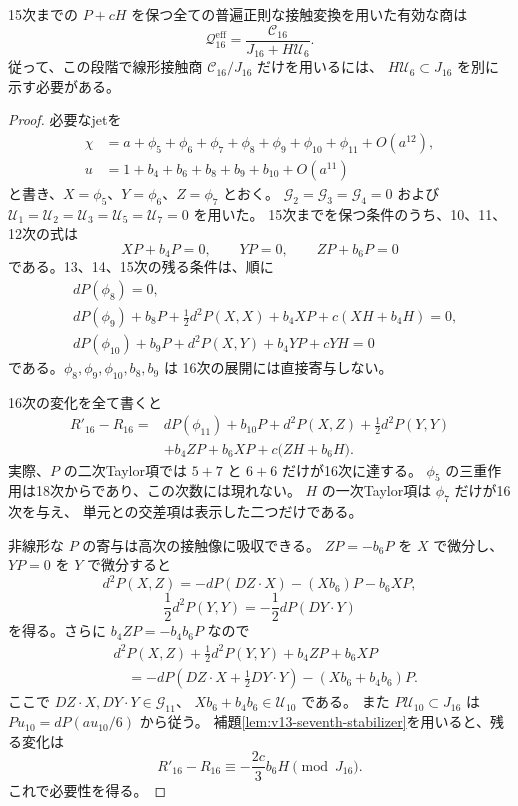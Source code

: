 \begin{proposition}[16次の有効な接触商]
\label{prop:v13-effective-contact-sixteen}
15次までの $P+cH$ を保つ全ての普遍正則な接触変換を用いた有効な商は
\begin{equation}\label{eq:v13-effective-sixteen-quotient}
 \boxed{\displaystyle
 \mathcal Q^{\mathrm{eff}}_{16}
 =\frac{\mathcal C_{16}}{J_{16}+H\mathcal U_6}.
 }
\end{equation}
従って、この段階で線形接触商 $\mathcal C_{16}/J_{16}$ だけを用いるには、
$H\mathcal U_6\subset J_{16}$ を別に示す必要がある。
\end{proposition}
\begin{proof}
必要なjetを
\begin{align*}
 \chi&=a+\phi_5+\phi_6+\phi_7+\phi_8+\phi_9
                +\phi_{10}+\phi_{11}+O(a^{12}),\\
 u&=1+b_4+b_6+b_8+b_9+b_{10}+O(a^{11})
\end{align*}
と書き、$X=\phi_5$、$Y=\phi_6$、$Z=\phi_7$ とおく。
$\mathcal G_2=\mathcal G_3=\mathcal G_4=0$ および
$\mathcal U_1=\mathcal U_2=\mathcal U_3=\mathcal U_5=\mathcal U_7=0$
を用いた。
15次までを保つ条件のうち、10、11、12次の式は
\[
 XP+b_4P=0,\qquad YP=0,\qquad ZP+b_6P=0
\]
である。13、14、15次の残る条件は、順に
\begin{align*}
 &dP(\phi_8)=0,\\
 &dP(\phi_9)+b_8P+\frac12d^2P(X,X)+b_4XP
                         +c(XH+b_4H)=0,\\
 &dP(\phi_{10})+b_9P+d^2P(X,Y)+b_4YP+cYH=0
\end{align*}
である。$\phi_8,\phi_9,\phi_{10},b_8,b_9$ は
16次の展開には直接寄与しない。

16次の変化を全て書くと
\begin{align*}
 R'_{16}-R_{16}
 ={}&dP(\phi_{11})+b_{10}P
       +d^2P(X,Z)+\frac12d^2P(Y,Y)\\
    &+b_4ZP+b_6XP+c\bigl(ZH+b_6H\bigr).
\end{align*}
実際、$P$ の二次Taylor項では $5+7$ と $6+6$ だけが16次に達する。
$\phi_5$ の三重作用は18次からであり、この次数には現れない。
$H$ の一次Taylor項は $\phi_7$ だけが16次を与え、
単元との交差項は表示した二つだけである。

非線形な $P$ の寄与は高次の接触像に吸収できる。
$ZP=-b_6P$ を $X$ で微分し、$YP=0$ を $Y$ で微分すると
\[
 d^2P(X,Z)=-dP(DZ\cdot X)-(Xb_6)P-b_6XP,
\]
\[
 \frac12d^2P(Y,Y)=-\frac12dP(DY\cdot Y)
\]
を得る。さらに $b_4ZP=-b_4b_6P$ なので
\begin{align*}
 &d^2P(X,Z)+\frac12d^2P(Y,Y)+b_4ZP+b_6XP\\
 &\hspace{1em}=-dP\left(DZ\cdot X+\frac12DY\cdot Y\right)
               -(Xb_6+b_4b_6)P.
\end{align*}
ここで $DZ\cdot X,DY\cdot Y\in\mathcal G_{11}$、
$Xb_6+b_4b_6\in\mathcal U_{10}$ である。
また $P\mathcal U_{10}\subset J_{16}$ は
$Pu_{10}=dP(au_{10}/6)$ から従う。
補題\ref{lem:v13-seventh-stabilizer}を用いると、残る変化は
\[
 R'_{16}-R_{16}\equiv-\frac{2c}{3}b_6H\pmod{J_{16}}.
\]
これで必要性を得る。


\end{proof}
